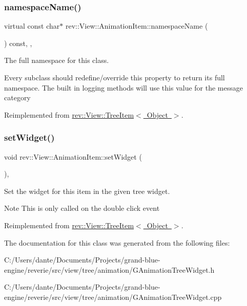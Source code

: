 \subsubsection{\texorpdfstring{namespaceName()}{namespaceName()}}
{\footnotesize\ttfamily virtual const char$\ast$ rev\+::\+View\+::\+Animation\+Item\+::namespace\+Name (\begin{DoxyParamCaption}{ }\end{DoxyParamCaption}) const\hspace{0.3cm}{\ttfamily [inline]}, {\ttfamily [override]}, {\ttfamily [virtual]}}



The full namespace for this class. 

Every subclass should redefine/override this property to return its full namespace. The built in logging methods will use this value for the message category 

Reimplemented from \mbox{\hyperlink{classrev_1_1_view_1_1_tree_item_a3bb552a87176f4b12848e43dfdd287b2}{rev\+::\+View\+::\+Tree\+Item$<$ Object $>$}}.

\mbox{\label{classrev_1_1_view_1_1_animation_item_a20494b0ab95631fb2e2aec918952f0f4}} 
\subsubsection{\texorpdfstring{setWidget()}{setWidget()}}
{\footnotesize\ttfamily void rev\+::\+View\+::\+Animation\+Item\+::set\+Widget (\begin{DoxyParamCaption}{ }\end{DoxyParamCaption})\hspace{0.3cm}{\ttfamily [override]}, {\ttfamily [virtual]}}



Set the widget for this item in the given tree widget. 

\begin{DoxyNote}{Note}
This is only called on the double click event 
\end{DoxyNote}


Reimplemented from \mbox{\hyperlink{classrev_1_1_view_1_1_tree_item_a24faa4e374ec0728c7eda8f50ca575df}{rev\+::\+View\+::\+Tree\+Item$<$ Object $>$}}.



The documentation for this class was generated from the following files\+:\begin{DoxyCompactItemize}
\item 
C\+:/\+Users/dante/\+Documents/\+Projects/grand-\/blue-\/engine/reverie/src/view/tree/animation/G\+Animation\+Tree\+Widget.\+h\item 
C\+:/\+Users/dante/\+Documents/\+Projects/grand-\/blue-\/engine/reverie/src/view/tree/animation/G\+Animation\+Tree\+Widget.\+cpp\end{DoxyCompactItemize}
